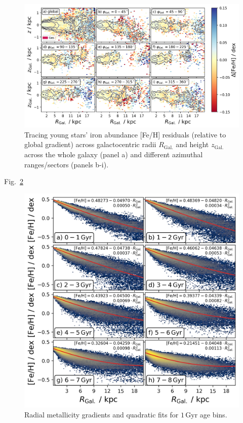 \documentclass[fleqn,usenatbib]{mnras}
\begin{document}
\begin{figure}
    \centering
    \includegraphics[width=\columnwidth]{figures/tracing_fe_h_residuals_young_stars_in_angles.png}
    \caption{Tracing young stars' iron abundance [Fe/H] residuals (relative to global gradient) across galactocentric radii $R_\mathrm{Gal.}$ and height $z_\mathrm{Gal.}$ across the whole galaxy (panel a) and different azimuthal ranges/sectors (panels b-i).}
    \label{fig:tracing_fe_h_residuals_young_stars_in_angles}
\end{figure}

Fig.~\ref{fig:quadratic_fit_across_ages}

\begin{figure}
    \centering
    \includegraphics[width=\columnwidth]{figures/quadratic_fit_across_ages.png}
    \caption{Radial metallicity gradients and quadratic fits for $1\,\mathrm{Gyr}$ age bins.}
    \label{fig:quadratic_fit_across_ages}
\end{figure}


\bsp	%
\label{lastpage}
\end{document}
